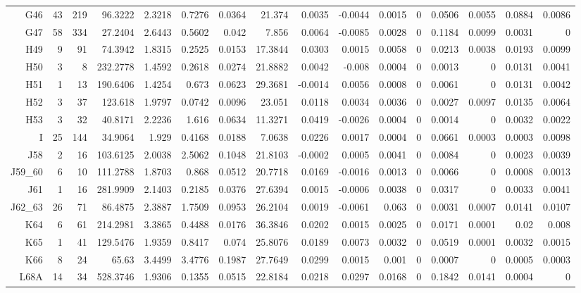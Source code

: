 \begin{table}[!htb]
{\begin{tabular}{rrrrrrrrrrrrrrrr}
G46 & 43 & 219 & 96.3222 & 2.3218 & 0.7276 & 0.0364 & 21.374 & 0.0035 & -0.0044 & 0.0015 & 0 & 0.0506 & 0.0055 & 0.0884 & 0.0086 \\
G47 & 58 & 334 & 27.2404 & 2.6443 & 0.5602 & 0.042 & 7.856 & 0.0064 & -0.0085 & 0.0028 & 0 & 0.1184 & 0.0099 & 0.0031 & 0 \\
H49 & 9 & 91 & 74.3942 & 1.8315 & 0.2525 & 0.0153 & 17.3844 & 0.0303 & 0.0015 & 0.0058 & 0 & 0.0213 & 0.0038 & 0.0193 & 0.0099 \\
H50 & 3 & 8 & 232.2778 & 1.4592 & 0.2618 & 0.0274 & 21.8882 & 0.0042 & -0.008 & 0.0004 & 0 & 0.0013 & 0 & 0.0131 & 0.0041 \\
H51 & 1 & 13 & 190.6406 & 1.4254 & 0.673 & 0.0623 & 29.3681 & -0.0014 & 0.0056 & 0.0008 & 0 & 0.0061 & 0 & 0.0131 & 0.0042 \\
H52 & 3 & 37 & 123.618 & 1.9797 & 0.0742 & 0.0096 & 23.051 & 0.0118 & 0.0034 & 0.0036 & 0 & 0.0027 & 0.0097 & 0.0135 & 0.0064 \\
H53 & 3 & 32 & 40.8171 & 2.2236 & 1.616 & 0.0634 & 11.3271 & 0.0419 & -0.0026 & 0.0004 & 0 & 0.0014 & 0 & 0.0032 & 0.0022 \\
I & 25 & 144 & 34.9064 & 1.929 & 0.4168 & 0.0188 & 7.0638 & 0.0226 & 0.0017 & 0.0004 & 0 & 0.0661 & 0.0003 & 0.0003 & 0.0098 \\
J58 & 2 & 16 & 103.6125 & 2.0038 & 2.5062 & 0.1048 & 21.8103 & -0.0002 & 0.0005 & 0.0041 & 0 & 0.0084 & 0 & 0.0023 & 0.0039 \\
J59\_60 & 6 & 10 & 111.2788 & 1.8703 & 0.868 & 0.0512 & 20.7718 & 0.0169 & -0.0016 & 0.0013 & 0 & 0.0066 & 0 & 0.0008 & 0.0013 \\
J61 & 1 & 16 & 281.9909 & 2.1403 & 0.2185 & 0.0376 & 27.6394 & 0.0015 & -0.0006 & 0.0038 & 0 & 0.0317 & 0 & 0.0033 & 0.0041 \\
J62\_63 & 26 & 71 & 86.4875 & 2.3887 & 1.7509 & 0.0953 & 26.2104 & 0.0019 & -0.0061 & 0.063 & 0 & 0.0031 & 0.0007 & 0.0141 & 0.0107 \\
K64 & 6 & 61 & 214.2981 & 3.3865 & 0.4488 & 0.0176 & 36.3846 & 0.0202 & 0.0015 & 0.0025 & 0 & 0.0171 & 0.0001 & 0.02 & 0.008 \\
K65 & 1 & 41 & 129.5476 & 1.9359 & 0.8417 & 0.074 & 25.8076 & 0.0189 & 0.0073 & 0.0032 & 0 & 0.0519 & 0.0001 & 0.0032 & 0.0015 \\
K66 & 8 & 24 & 65.63 & 3.4499 & 3.4776 & 0.1987 & 27.7649 & 0.0299 & 0.0015 & 0.001 & 0 & 0.0007 & 0 & 0.0005 & 0.0003 \\
L68A & 14 & 34 & 528.3746 & 1.9306 & 0.1355 & 0.0515 & 22.8184 & 0.0218 & 0.0297 & 0.0168 & 0 & 0.1842 & 0.0141 & 0.0004 & 0 \\

\end{tabular}}
\end{table}
